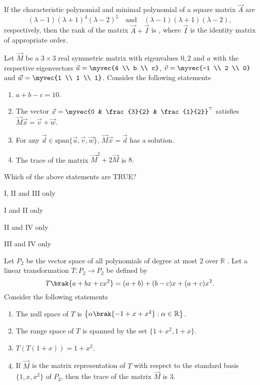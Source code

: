 \item If the characteristic polynomial and minimal polynomial of a square matrix $\vec{A}$ are  
\[
(\lambda - 1)(\lambda + 1)^4(\lambda - 2)^5
\quad \text{and} \quad
(\lambda - 1)(\lambda + 1)(\lambda - 2),
\]
respectively, then the rank of the matrix $\vec{A}+\vec{I}$ is \underline{\hspace{2cm}}, where $\vec{I}$ is the identity matrix of appropriate order.  
\hfill{}
\item Let $\vec{M}$ be a $3 \times 3$ real symmetric matrix with eigenvalues $0, 2$ and $a$ with the respective eigenvectors $\vec{u}=\myvec{4 \\ b \\ c}$, $\vec{v}=\myvec{-1 \\ 2 \\ 0}$ and $\vec{w}=\myvec{1 \\ 1 \\ 1}$.  
Consider the following statements
\begin{enumerate}[label=\Roman*.]
\item $a + b - c = 10$.
\item The vector $\vec{x}=\myvec{0 & \frac{3}{2} & \frac{1}{2}}^{\top}$ satisfies $\vec{M}\vec{x} = \vec{v} + \vec{w}$.
\item For any $\vec{d} \in \text{span}\{\vec{u},\vec{v},\vec{w}\}$, $\vec{M}\vec{x} = \vec{d}$ has a solution.
\item The trace of the matrix $\vec{M}^2 + 2\vec{M}$ is $8$.
\end{enumerate}
Which of the above statements are TRUE?
\hfill{}
\begin{enumerate}
\begin{multicols}{2}
\item I, II and III only
\item I and II only
\item II and IV only
\item III and IV only
\end{multicols}
\end{enumerate}
\item Let $P_{2}$ be the vector space of all polynomials of degree at most $2$ over $\mathbb{R}$ . Let a linear transformation $T: P_{2}\to P_{2}$ be defined by
\[
T\brak{a+bx+cx^{2}}=(a+b)+(b-c)x+(a+c)x^{2}.
\]
Consider the following statements
\begin{enumerate}[label=\Roman*.]
	\item The null space of $T$ is $\left\{\alpha \brak{-1+x+x^{2}} : \alpha \in \mathbb{R}\right\}$.  
	\item The range space of $T$ is spanned by the set $\{1+x^{2},1+x\}$.  
	\item $T(T(1+x))=1+x^{2}$.  
	\item If $\vec{M}$ is the matrix representation of $T$ with respect to the standard basis $\{1,x,x^{2}\}$ of $P_{2}$, then the trace of the matrix $\vec{M}$ is $3$.  
\end{enumerate}
